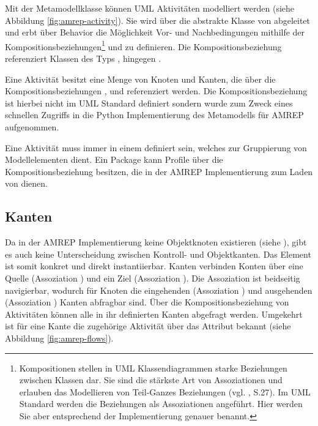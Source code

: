 Mit der Metamodellklasse  können UML Aktivitäten modelliert werden (siehe Abbildung \ref{fig:amrep-activity}). Sie wird über die abstrakte Klasse  von  abgeleitet und erbt über Behavior die Möglichkeit Vor- und Nachbedingungen mithilfe der Kompositionsbeziehungen\footnote{
Kompositionen stellen in UML Klassendiagrammen starke Beziehungen zwischen Klassen dar. Sie sind die stärkste Art von Assoziationen und erlauben das Modellieren von Teil-Ganzes Beziehungen (vgl. \citep{PilonePitman2005}, S.27). Im UML Standard werden die Beziehungen als Assoziationen angeführt. Hier werden Sie aber entsprechend der Implementierung genauer benannt.}
 und  zu definieren. Die Kompositionsbeziehung  referenziert Klassen des Typs ,  hingegen .


Eine Aktivität besitzt eine Menge von Knoten und Kanten, die über die Kompositionsbeziehungen ,  und  referenziert werden. Die Kompositionsbeziehung  ist hierbei nicht im UML Standard definiert sondern wurde zum Zweck eines schnellen Zugriffs in die Python Implementierung des Metamodells für AMREP aufgenommen.

Eine Aktivität muss immer in einem  definiert sein, welches zur Gruppierung von Modellelementen dient. Ein Package kann Profile über die Kompositionsbeziehung  besitzen, die in der AMREP Implementierung zum Laden von  dienen.


\subsection{Kanten}
Da in der AMREP Implementierung keine Objektknoten existieren (siehe ), gibt es auch keine Unterscheidung zwischen Kontroll- und Objektkanten. Das Element  ist somit konkret und direkt instantiierbar. Kanten verbinden Konten über eine Quelle (Assoziation ) und ein Ziel (Assoziation ). Die Assoziation ist beidseitig navigierbar, wodurch für Knoten die eingehenden (Assoziation ) und ausgehenden (Assoziation ) Kanten abfragbar sind. Über die Kompositionsbeziehung  von Aktivitäten können alle in ihr definierten Kanten abgefragt werden. Umgekehrt ist für eine Kante die zugehörige Aktivität über das Attribut  bekannt (siehe Abbildung \ref{fig:amrep-flows}).

